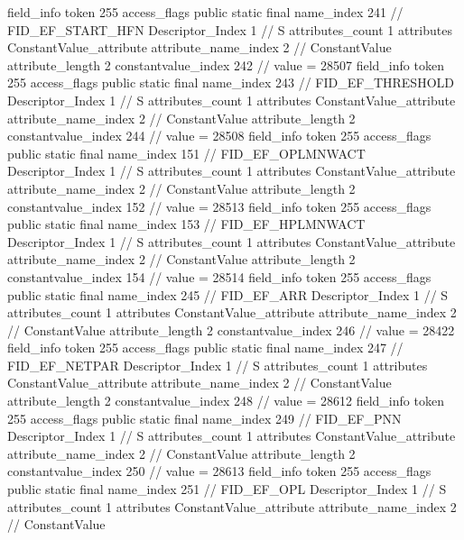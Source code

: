 {{{{{			}
			field_info {
				token	255
				access_flags	public static final
				name_index	241		// FID_EF_START_HFN
				Descriptor_Index	1		// S
				attributes_count	1
				attributes {
				ConstantValue_attribute {
					attribute_name_index	2		// ConstantValue
					attribute_length	2
					constantvalue_index	242		// value = 28507
				}
				}
			}
			field_info {
				token	255
				access_flags	public static final
				name_index	243		// FID_EF_THRESHOLD
				Descriptor_Index	1		// S
				attributes_count	1
				attributes {
				ConstantValue_attribute {
					attribute_name_index	2		// ConstantValue
					attribute_length	2
					constantvalue_index	244		// value = 28508
				}
				}
			}
			field_info {
				token	255
				access_flags	public static final
				name_index	151		// FID_EF_OPLMNWACT
				Descriptor_Index	1		// S
				attributes_count	1
				attributes {
				ConstantValue_attribute {
					attribute_name_index	2		// ConstantValue
					attribute_length	2
					constantvalue_index	152		// value = 28513
				}
				}
			}
			field_info {
				token	255
				access_flags	public static final
				name_index	153		// FID_EF_HPLMNWACT
				Descriptor_Index	1		// S
				attributes_count	1
				attributes {
				ConstantValue_attribute {
					attribute_name_index	2		// ConstantValue
					attribute_length	2
					constantvalue_index	154		// value = 28514
				}
				}
			}
			field_info {
				token	255
				access_flags	public static final
				name_index	245		// FID_EF_ARR
				Descriptor_Index	1		// S
				attributes_count	1
				attributes {
				ConstantValue_attribute {
					attribute_name_index	2		// ConstantValue
					attribute_length	2
					constantvalue_index	246		// value = 28422
				}
				}
			}
			field_info {
				token	255
				access_flags	public static final
				name_index	247		// FID_EF_NETPAR
				Descriptor_Index	1		// S
				attributes_count	1
				attributes {
				ConstantValue_attribute {
					attribute_name_index	2		// ConstantValue
					attribute_length	2
					constantvalue_index	248		// value = 28612
				}
				}
			}
			field_info {
				token	255
				access_flags	public static final
				name_index	249		// FID_EF_PNN
				Descriptor_Index	1		// S
				attributes_count	1
				attributes {
				ConstantValue_attribute {
					attribute_name_index	2		// ConstantValue
					attribute_length	2
					constantvalue_index	250		// value = 28613
				}
				}
			}
			field_info {
				token	255
				access_flags	public static final
				name_index	251		// FID_EF_OPL
				Descriptor_Index	1		// S
				attributes_count	1
				attributes {
				ConstantValue_attribute {
					attribute_name_index	2		// ConstantValue
}}}}}}}
